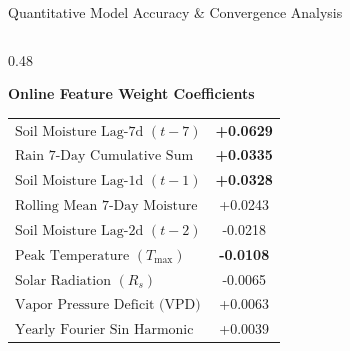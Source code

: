 \documentclass[aspectratio=169,10pt]{beamer}
\begin{document}
\begin{frame}{Quantitative Model Accuracy \& Convergence Analysis}
\begin{columns}[T]
\begin{column}{0.48\textwidth}
\begin{exampleblock}{\textbf{Online Feature Weight Coefficients}}
{\begin{tabular}{lc}
                    \midrule
                    $\text{Soil Moisture Lag-7d } (t-7)$ & \textbf{+0.0629} \\
                    $\text{Rain 7-Day Cumulative Sum}$ & \textbf{+0.0335} \\
                    $\text{Soil Moisture Lag-1d } (t-1)$ & \textbf{+0.0328} \\
                    $\text{Rolling Mean 7-Day Moisture}$ & +0.0243 \\
                    $\text{Soil Moisture Lag-2d } (t-2)$ & -0.0218 \\
                    $\text{Peak Temperature } (T_{\max})$ & \textbf{-0.0108} \\
                    $\text{Solar Radiation } (R_s)$ & -0.0065 \\
                    $\text{Vapor Pressure Deficit (VPD)}$ & +0.0063 \\
                    $\text{Yearly Fourier Sin Harmonic}$ & +0.0039 \\
                    \bottomrule
                \end{tabular}
                }
            \end{exampleblock}
        \end{column}
    \end{columns}
\end{frame}
\end{document}
